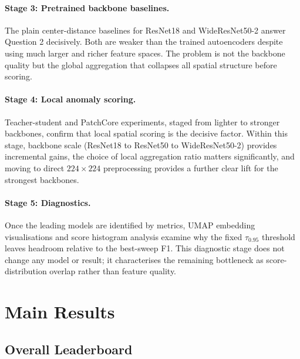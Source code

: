 \documentclass[11pt]{article}
\begin{document}
\paragraph{Stage 3: Pretrained backbone baselines.}
The plain center-distance baselines for ResNet18 and WideResNet50-2 answer
Question 2 decisively. Both are weaker than the trained autoencoders despite
using much larger and richer feature spaces. The problem is not the backbone
quality but the global aggregation that collapses all spatial structure before
scoring.

\paragraph{Stage 4: Local anomaly scoring.}
Teacher-student and PatchCore experiments, staged from lighter to stronger
backbones, confirm that local spatial scoring is the decisive factor. Within
this stage, backbone scale (ResNet18 to ResNet50 to WideResNet50-2) provides
incremental gains, the choice of local aggregation ratio matters significantly,
and moving to direct $224\!\times\!224$ preprocessing provides a further clear
lift for the strongest backbones.

\paragraph{Stage 5: Diagnostics.}
Once the leading models are identified by metrics, UMAP embedding visualisations
and score histogram analysis examine why the fixed $\tau_{0.95}$ threshold
leaves headroom relative to the best-sweep F1. This diagnostic stage does not
change any model or result; it characterises the remaining bottleneck as
score-distribution overlap rather than feature quality.

\section{Main Results}

\subsection{Overall Leaderboard}
\end{document}
